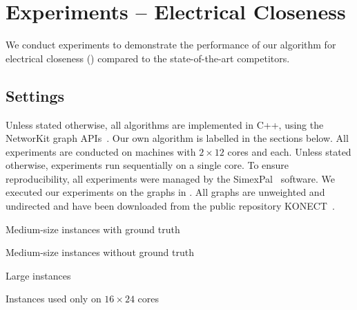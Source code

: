 \section{Experiments -- Electrical Closeness}
\label{sec:el-clos:exp-el-clos}

We conduct experiments to demonstrate the performance of our algorithm for electrical
closeness () compared to the state-of-the-art
competitors.

\subsection{Settings}
Unless stated otherwise, all algorithms are implemented in C++, using the
NetworKit graph APIs~\cite{DBLP:journals/netsci/StaudtSM16}.
Our own algorithm is labelled \ust in the sections below.
All experiments are conducted on \cpumodel machines with $2\times 12$ cores
and \RAM each. Unless stated otherwise, experiments run sequentially on a single core.
To ensure reproducibility, all experiments were managed by the
SimexPal~\cite{DBLP:journals/algorithms/AngrimanGLMNPT19} software.
We executed our experiments on the graphs in
. All graphs are unweighted and undirected
and have been downloaded from the public repository
KONECT~\cite{kunegis2013konect}.

\begin{table}
\footnotesize
\centering
{}
\label{tab:el-clos:insts-el-clos}

\begin{subtable}[t]{\textwidth}
\centering
\caption{Medium-size instances with ground truth}
\label{tab:el-clos:insts-ec-med-gt}

\end{subtable}\bigskip

\begin{subtable}[t]{\textwidth}
\centering
\caption{Medium-size instances without ground truth}
\label{tab:el-clos:insts-ec-med-no-gt}

\end{subtable}\bigskip

\begin{subtable}[t]{\textwidth}
\centering
\caption{Large instances}
\label{tab:el-clos:insts-ec-large}

\end{subtable}\bigskip

\begin{subtable}[t]{\textwidth}
\centering
\caption{Instances used only on $16\times 24$ cores}
\label{tab:el-clos:insts-ec-cluster}

\end{subtable}
\end{table}


